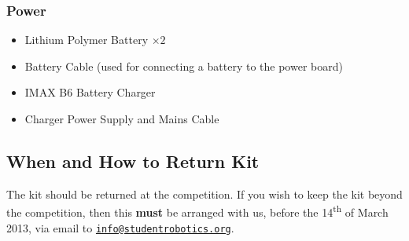 \subsubsection {Power}

\begin{itemize}
 \item Lithium Polymer Battery $\times 2$
 \item Battery Cable (used for connecting a battery to the power board)
 \item IMAX B6 Battery Charger
 \item Charger Power Supply and Mains Cable
\end{itemize}

\subsection {When and How to Return Kit}

The kit should be returned at the competition.
If you wish to keep the kit beyond the competition, then this \textbf{must} be arranged with us,
 before the 14\textsuperscript{th} of March 2013, via email to \href{mailto:info@studentrobotics.org}{\nolinkurl{info@studentrobotics.org}}.
